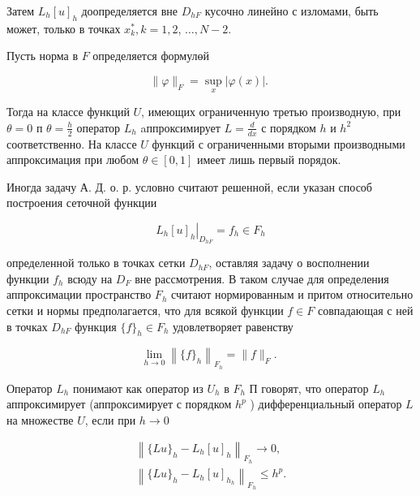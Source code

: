 \documentclass[10pt]{article}
\begin{document}
Затем $L_{h}[u]_{h}$ доопределяется вне $D_{h F}$ кусочно линейно с изломами, быть может, только в точках $x_{k}^{*}, k=1,2$, $\ldots, N-2$.



Пусть норма в $F$ определяется формулөй



\[

\|\varphi\|_{F}=\sup _{x}|\varphi(x)| \text {. }

\]



Тогда на классе функций $U$, имеющих ограниченную третью производную, при $\theta=0$ п $\theta=\frac{h}{2}$ оператор $L_{h}$ aппроксимирует $L=\frac{d}{d x}$ с порядком $h$ и $h^{2}$ соответственно. На классе $U$ функций с ограниченными вторыми производными аппроксимация при любом $\theta \in[0,1]$ имеет лишь первый порядок.



Иногда задачу А. Д. о. р. условно считают решенной, если указан способ построения сеточной функции



\[

\left.L_{h}[u]_{h}\right|_{D_{h F}}=f_{h} \in F_{h}

\]



определенной только в точках сетки $D_{h F}$, оставляя задачу о восполнении функции $f_{h}$ всюду на $D_{F}$ вне рассмотрения. В таком случае для определения аппроксимации пространство $F_{h}$ считают нормированным и притом относительно сетки и нормы предполагается, что для всякой функции $f \in F$ совпадающая с ней в точках $D_{h F}$ функция $\{f\}_{h} \in F_{h}$ удовлетворяет равенству



\[

\lim _{h \rightarrow 0}\left\|\{f\}_{h}\right\|_{F_{h}}=\|f\|_{F} \text {. }

\]



Оператор $L_{h}$ понимают как оператор из $U_{h}$ в $F_{h}$ П говорят, что оператор $L_{h}$ аппроксимирует (аппроксимирует с порядком $h^{p}$ ) дифференциальный оператор $L$ на множестве $U$, если при $h \rightarrow 0$



\[

\begin{gathered}

\left\|\{L u\}_{h}-L_{h}[u]_{h}\right\|_{F_{h}} \longrightarrow 0, \\

\left\|\{L u\}_{h}-L_{h}[u]_{h_{h}}\right\|_{F_{h}} \leqslant h^{p} .

\end{gathered}

\]
\end{document}
